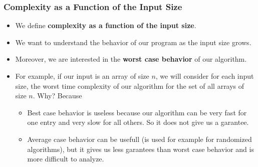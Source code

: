 \documentclass{beamer}
\begin{document}
\begin{frame}%
\frametitle{Complexity as a Function of the Input Size}

\begin{itemize}

\item We define \textbf{complexity as a function of the input size}.

\vspace{0.1cm}

\item<2-> We want to understand
the behavior of our program as the input size grows.

\vspace{0.1cm}

\item<3-> Moreover, we are
interested in the \textbf{worst case behavior} of our algorithm.

\vspace{0.1cm}

\item<4-> For example, if our input is an array of size $n$, we will consider for each input size, the worst time complexity of our
algorithm for the set of all arrays of size $n$. Why? Because
\begin{itemize}
\vspace{0.05cm}
\item<4-> Best case behavior is useless because our algorithm can be very fast for one entry and very slow for all others. So it does not give
us a garantee.

\vspace{0.05cm}

\item<4-> Average case behavior can be usefull (is used for example for randomized algorithms), but it gives us less garantees than worst case behavior
and is more difficult to analyze.

\end{itemize}

\end{itemize}

\end{frame}
\end{document}
